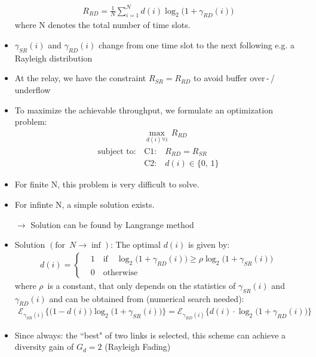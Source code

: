 \documentclass[a4paper, 10pt]{article}
\begin{document}
\begin{itemize}
	\begin{align*}
		R_{RD} = \frac{1}{N}\sum_{i=1}^{N}d(i)\log_2\bigl(1 + \gamma_{RD}(i)\bigr)
	\end{align*}
	where N denotes the total number of time slots.
	\item $\gamma_{SR}(i) $ and $ \gamma_{RD}(i) $ change from one time slot to the next following e.g. a Rayleigh distribution
	\item At the relay, we have the constraint $ R_{SR} = R_{RD} $ to avoid buffer over\,-\,/\,underflow
	\item To maximize the achievable throughput, we formulate an optimization problem:
	\begin{align*}
		&\underset{d(i) \forall i}{\max}\, R_{RD} \\ 
		\text{subject to:}\, &\text{C1:}\quad R_{RD} = R_{SR} \\
		&\text{C2:}\quad d(i) \in \{0,\,1\}
	\end{align*}
	\item For finite N, this problem is very difficult to solve.
	\item For infinte N, a simple solution exists.
	\item[$\rightarrow$] Solution can be found by Langrange method
	\item Solution $(\text{for }\, N \rightarrow \inf )$: The optimal $d(i) $ is given by:
	\begin{align*}
		d(i) = 
		\begin{cases}
			&1\quad \text{if}\quad \log_2\bigl( 1 + \gamma_{RD}(i)\bigr) \geq \rho \log_2\bigl( 1 + \gamma_{SR}(i)\bigr) \\
			&0\quad \text{otherwise} 
		\end{cases}
\end{align*}	 
	where $\rho $\, is a constant, that only depends on the statistics of $\gamma_{SR}(i) $ and $ \gamma_{RD}(i) $ and can be obtained from (numerical search needed):
	\begin{align*}
		\mathcal{E}_{\gamma_{SR}(i)}\bigl\{\bigl(1 - d(i)\bigr)\log_2\bigl(1 + \gamma_{SR}(i)\bigr)\bigr\} = \mathcal{E}_{\gamma_{RD}(i)}\bigl\{d(i)\cdot\log_2\bigl(1 + \gamma_{RD}(i)\bigr)\bigr\}
	\end{align*}
	\item Since always: the ``best" of two links is selected, this scheme can achieve a diversity gain of $G_d = 2 $ (Rayleigh Fading)
\end{itemize}
\end{document}
